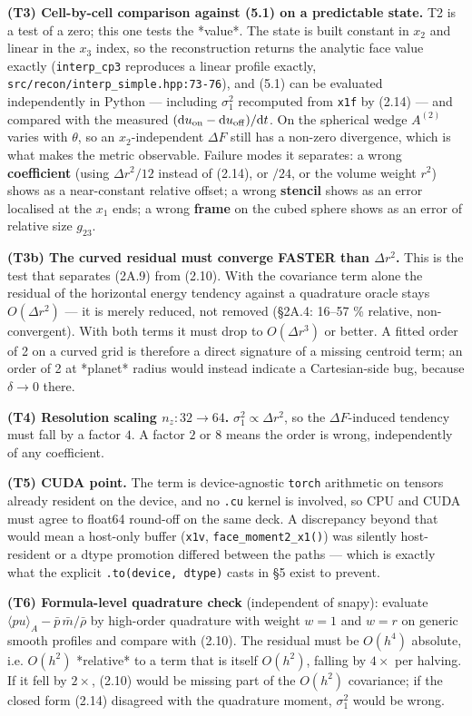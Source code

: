 \documentclass[11pt,a4paper]{article}
\begin{document}
\textbf{(T3) Cell-by-cell comparison against (5.1) on a predictable state.} T2 is a
test of a zero; this one tests the *value*. The state is built constant in $x_2$
and linear in the $x_3$ index, so the reconstruction returns the analytic face
value exactly (\texttt{interp\_cp3} reproduces a linear profile exactly,
\texttt{src/recon/interp\_simple.hpp:73-76}), and (5.1) can be evaluated independently in
Python — including $\sigma_1^2$ recomputed from \texttt{x1f} by (2.14) — and compared
with the measured $(\mathrm{d}u_{\rm on}-\mathrm{d}u_{\rm off})/\mathrm{d}t$. On
the spherical wedge $A^{(2)}$ varies with $\theta$, so an $x_2$-independent
$\Delta F$ still has a non-zero divergence, which is what makes the metric
observable. Failure modes it separates: a wrong \textbf{coefficient} (using
$\Delta r^2/12$ instead of (2.14), or $/24$, or the volume weight $r^2$) shows as
a near-constant relative offset; a wrong \textbf{stencil} shows as an error localised
at the $x_1$ ends; a wrong \textbf{frame} on the cubed sphere shows as an error of
relative size $g_{23}$.

\textbf{(T3b) The curved residual must converge FASTER than $\Delta r^2$.} This is the
test that separates (2A.9) from (2.10). With the covariance term alone the
residual of the horizontal energy tendency against a quadrature oracle stays
$O(\Delta r^2)$ — it is merely reduced, not removed (§2A.4: 16–57 \% relative,
non-convergent). With both terms it must drop to $O(\Delta r^3)$ or better. A
fitted order of 2 on a curved grid is therefore a direct signature of a missing
centroid term; an order of 2 at *planet* radius would instead indicate a
Cartesian-side bug, because $\delta\to0$ there.

\textbf{(T4) Resolution scaling $n_z: 32\to64$.} $\sigma_1^2\propto\Delta r^2$, so the
$\Delta F$-induced tendency must fall by a factor $4$. A factor $2$ or $8$ means
the order is wrong, independently of any coefficient.

\textbf{(T5) CUDA point.} The term is device-agnostic \texttt{torch} arithmetic on tensors
already resident on the device, and no \texttt{.cu} kernel is involved, so CPU and CUDA
must agree to float64 round-off on the same deck. A discrepancy beyond that
would mean a host-only buffer (\texttt{x1v}, \texttt{face\_moment2\_x1()}) was silently
host-resident or a dtype promotion differed between the paths — which is exactly
what the explicit \texttt{.to(device, dtype)} casts in §5 exist to prevent.

\textbf{(T6) Formula-level quadrature check} (independent of snapy):
evaluate $\langle pu\rangle_A-\bar p\,\bar m/\bar\rho$ by high-order quadrature
with weight $w=1$ and $w=r$ on generic smooth profiles and compare with (2.10).
The residual must be $O(h^4)$ absolute, i.e. $O(h^2)$ *relative* to a term that
is itself $O(h^2)$, falling by $4\times$ per halving. If it fell by $2\times$,
(2.10) would be missing part of the $O(h^2)$ covariance; if the closed form
(2.14) disagreed with the quadrature moment, $\sigma_1^2$ would be wrong.
\end{document}
